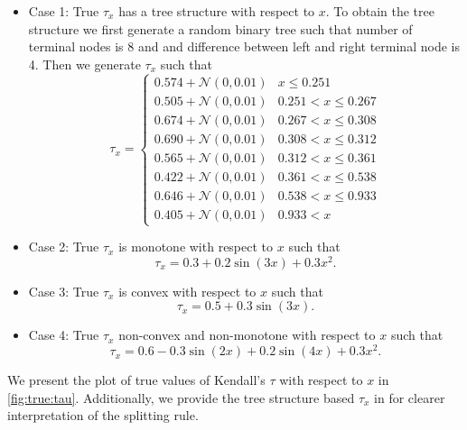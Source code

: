 \documentclass{amsart}
\begin{document}
\begin{itemize}
    \item Case 1: True $\tau_x$ has a tree structure with respect to $x$. To obtain the tree structure we first generate a random binary tree such that number of terminal nodes is 8 and and difference between left and right terminal node is 4. Then we generate $\tau_x$ such that
    \begin{equation}
        \tau_x = \begin{cases}
        0.574 + \mathcal{N}(0,0.01) & x \le 0.251\\
        0.505 + \mathcal{N}(0,0.01) & 0.251 < x \le 0.267\\
        0.674 + \mathcal{N}(0,0.01) & 0.267 < x \le 0.308\\
        0.690 + \mathcal{N}(0,0.01) & 0.308 < x \le 0.312\\
        0.565 + \mathcal{N}(0,0.01) & 0.312 < x \le 0.361\\
        0.422 + \mathcal{N}(0,0.01) & 0.361 < x \le 0.538\\
        0.646 + \mathcal{N}(0,0.01) & 0.538 < x \le 0.933\\
        0.405 + \mathcal{N}(0,0.01) & 0.933 < x
    \end{cases}
    \end{equation}
    \item Case 2: True $\tau_x$ is monotone with respect to $x$ such that 
    \begin{equation}\label{eq:synth:tau_x:case2}
        \tau_x = 0.3 + 0.2 \sin(3x) + 0.3x^2.
    \end{equation}
    \item Case 3: True $\tau_x$ is convex with respect to $x$ such that 
    \begin{equation}\label{eq:synth:tau_x:case3}
        \tau_x = 0.5 + 0.3 \sin(3x).
    \end{equation}
    \item Case 4: True $\tau_x$ non-convex and non-monotone with respect to $x$ such that 
    \begin{equation}\label{eq:synth:tau_x:case4}
        \tau_x = 0.6 - 0.3 \sin(2x) + 0.2 \sin(4x) + 0.3 x^2.
    \end{equation}
\end{itemize}

We present the plot of true values of Kendall's $\tau$ with respect to $x$ in \cref{fig:true:tau}. Additionally, we provide the tree structure based $\tau_x$ in for clearer interpretation of the splitting rule.
\end{document}
